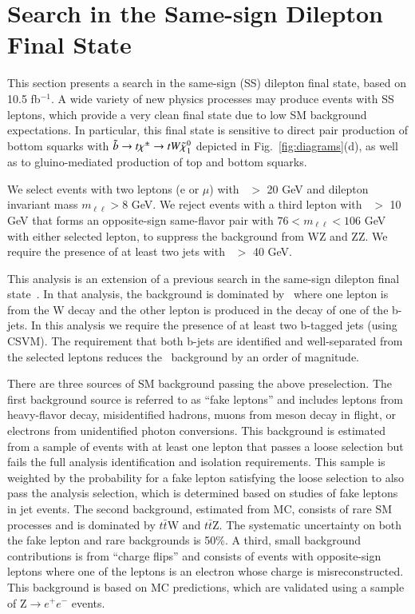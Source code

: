 \section{Search in the Same-sign Dilepton Final State}
\label{sec:ss}

This section presents a search in the same-sign (SS) dilepton final state, based on 10.5 fb$^{-1}$.
A wide variety of new physics processes may produce events with SS leptons, which provide a very clean
final state due to low SM background expectations. In particular, this final state is sensitive to 
direct pair production of bottom squarks with $\tilde{b}\to t \chi^{\pm}\to t W \tilde{\chi}_{1}^{0}$ depicted in Fig.~\ref{fig:diagrams}(d),
as well as to gluino-mediated production of top and bottom squarks.

We select events with two leptons (e or $\mu$) with \pt\ $>$ 20 GeV and dilepton invariant mass $m_{\ell\ell}>8$ GeV. 
We reject events with a third lepton with \pt\ $>$ 10 GeV that forms an opposite-sign
same-flavor pair with $76 < m_{\ell\ell} < 106$ GeV with either selected lepton, to suppress
the background from WZ and ZZ. We require the presence of at least two jets with \pt\ $>$ 40 GeV.

This analysis is an extension of a previous search in the same-sign dilepton final state~\cite{ref:ss_inclusive}.
In that analysis, the background is dominated by \ttljets\ where one lepton is from the W decay and the other
lepton is produced in the decay of one of the b-jets. In this analysis we require the presence of at least two
b-tagged jets (using CSVM). The requirement that both b-jets are identified and well-separated from the selected leptons
reduces the \ttljets\ background by an order of magnitude. 

There are three sources of SM background passing the above preselection. 
The first background source is referred to as ``fake leptons'' and includes leptons from heavy-flavor decay, 
misidentified hadrons, muons from meson decay in flight, or electrons from unidentified photon conversions. 
This background is estimated from a sample of events with at least one lepton that passes a loose selection 
but fails the full analysis identification and isolation requirements. This sample is weighted by the probability 
for a fake lepton satisfying the loose selection to also pass the analysis selection, which is determined based 
on studies of fake 
leptons in jet events. The second background, estimated from MC, consists of rare SM processes and is dominated 
by $t\bar{t}$W and $t\bar{t}$Z. The systematic uncertainty on both the fake lepton and rare backgrounds is 50\%. 
A third, small background contributions is from ``charge flips'' and consists of events with opposite-sign leptons 
where one of the leptons is an electron whose charge is misreconstructed. This background is based on MC predictions,
which are validated using a sample of Z$\to e^+e^-$ events.

